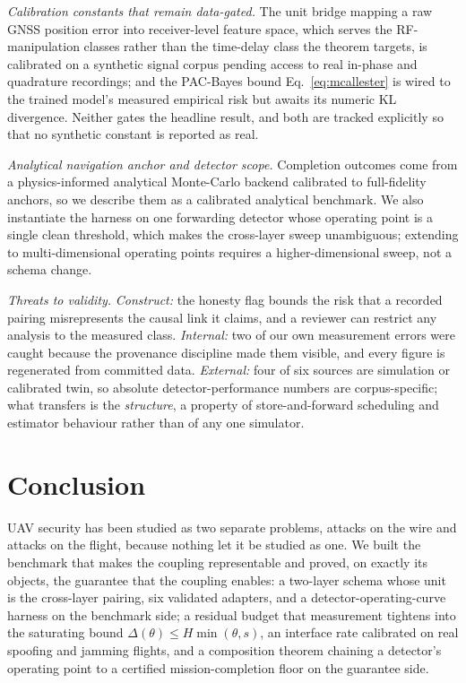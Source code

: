 \emph{Calibration constants that remain data-gated.} The unit bridge mapping a
raw GNSS position error into receiver-level feature space, which serves the
RF-manipulation classes rather than the time-delay class the theorem targets, is
calibrated on a synthetic signal corpus pending access to real in-phase and
quadrature recordings; and the PAC-Bayes bound Eq.~\eqref{eq:mcallester} is
wired to the trained model's measured empirical risk but awaits its numeric KL
divergence. Neither gates the headline result, and both are tracked explicitly
so that no synthetic constant is reported as real.

\emph{Analytical navigation anchor and detector scope.} Completion outcomes come
from a physics-informed analytical Monte-Carlo backend calibrated to
full-fidelity anchors, so we describe them as a calibrated analytical benchmark.
We also instantiate the harness on one forwarding detector whose operating point
is a single clean threshold, which makes the cross-layer sweep unambiguous;
extending to multi-dimensional operating points requires a higher-dimensional
sweep, not a schema change.

\emph{Threats to validity.} \emph{Construct:} the honesty flag bounds the risk
that a recorded pairing misrepresents the causal link it claims, and a reviewer
can restrict any analysis to the measured class. \emph{Internal:} two of our own
measurement errors were caught because the provenance discipline made them
visible, and every figure is regenerated from committed data. \emph{External:}
four of six sources are simulation or calibrated twin, so absolute
detector-performance numbers are corpus-specific; what transfers is the
\emph{structure}, a property of store-and-forward scheduling and estimator
behaviour rather than of any one simulator.

\section{Conclusion}
\label{sec:conclusion}
UAV security has been studied as two separate problems, attacks on the wire and
attacks on the flight, because nothing let it be studied as one. We built the
benchmark that makes the coupling representable and proved, on exactly its
objects, the guarantee that the coupling enables: a two-layer schema whose unit
is the cross-layer pairing, six validated adapters, and a
detector-operating-curve harness on the benchmark side; a residual budget that
measurement tightens into the saturating bound $\Delta(\theta)\le
H\min(\theta,s)$, an interface rate calibrated on real spoofing and jamming
flights, and a composition theorem chaining a detector's operating point to a
certified mission-completion floor on the guarantee side.

